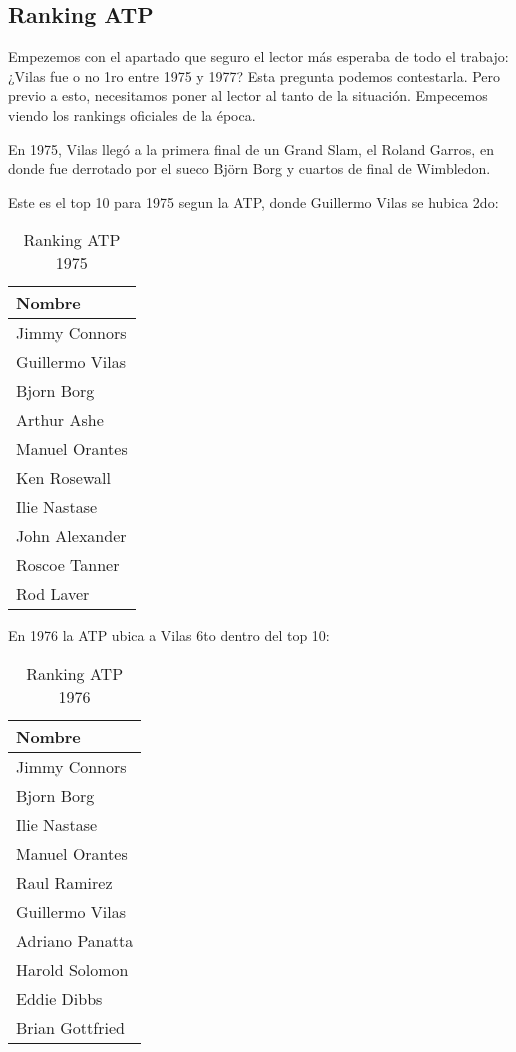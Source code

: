\subsection{Ranking ATP}

Empezemos con el apartado que seguro el lector más esperaba de todo el trabajo: ¿Vilas fue o no 1ro entre 1975 y 1977? Esta pregunta podemos contestarla. Pero previo a esto, necesitamos poner al lector al tanto de la situación. Empecemos viendo los rankings oficiales de la época.

En 1975, Vilas llegó a la primera final de un Grand Slam, el Roland Garros, en donde fue derrotado por el sueco Björn Borg
y cuartos de final de Wimbledon.

Este es el top 10 para 1975 segun la ATP, donde Guillermo Vilas se hubica 2do:

\begin{table}[H]
\label{my-label}
\begin{tabular}{l}
\hline
Nombre \\ \hline
Jimmy Connors \\
Guillermo Vilas \\
Bjorn Borg \\
Arthur Ashe \\
Manuel Orantes \\
Ken Rosewall \\
Ilie Nastase \\
John Alexander \\
Roscoe Tanner \\
Rod Laver \\ \hline
\end{tabular}
\centering
\caption{Ranking ATP 1975}
\end{table}

En 1976 la ATP ubica a Vilas 6to dentro del top 10:

\begin{table}[H]
\label{my-label}
\begin{tabular}{l}
\hline
Nombre \\ \hline
Jimmy Connors \\
Bjorn Borg \\
Ilie Nastase \\
Manuel Orantes \\
Raul Ramirez \\
Guillermo Vilas \\
Adriano Panatta \\
Harold Solomon \\
Eddie Dibbs \\
Brian Gottfried \\ \hline 
\end{tabular}
\centering
\caption{Ranking ATP 1976}
\end{table}

